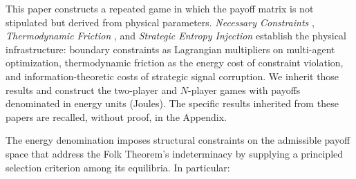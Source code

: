 \documentclass[11pt]{article}
\theoremstyle{plain}
\theoremstyle{definition}
\theoremstyle{remark}
\begin{document}
This paper constructs a repeated game in which the payoff matrix is not
stipulated but derived from physical parameters. \emph{Necessary
Constraints} \citep{TC-I}, \emph{Thermodynamic Friction} \citep{TC-IV},
and \emph{Strategic Entropy Injection} \citep{TC-II} establish the
physical infrastructure: boundary constraints as Lagrangian multipliers
on multi-agent optimization, thermodynamic friction as the energy cost
of constraint violation, and information-theoretic costs of strategic
signal corruption. We inherit those results and construct the two-player
and \(N\)-player games with payoffs denominated in energy units
(Joules). The specific results inherited from these papers are recalled,
without proof, in the Appendix.

The energy denomination imposes structural constraints on the admissible
payoff space that address the Folk Theorem's indeterminacy by supplying
a principled selection criterion among its equilibria. In particular:
\end{document}
